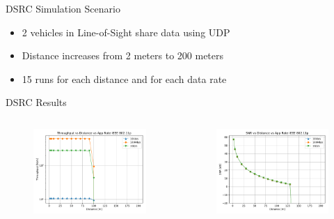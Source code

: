 \documentclass{beamer}
\begin{document}
	\begin{frame}{DSRC Simulation Scenario}
		\begin{itemize}
			\item 2 vehicles in Line-of-Sight share data using UDP\vspace{.5em}
			\item Distance increases from 2 meters to 200 meters\vspace{.5em}
			\item 15 runs for each distance and for each data rate
		\end{itemize}
	\end{frame}

	\begin{frame}{DSRC Results}
		\begin{columns}
				\begin{figure}
					\vspace{-0.2in}
					\includegraphics[scale=0.32]{throughput_distance_wave_UDP}
				\end{figure}
				\begin{figure}
					\vspace{-0.3in}
					\includegraphics[scale=0.32]{SNR_distance_wave_UDP}

\end{figure}
\end{columns}
\end{frame}
\end{document}

